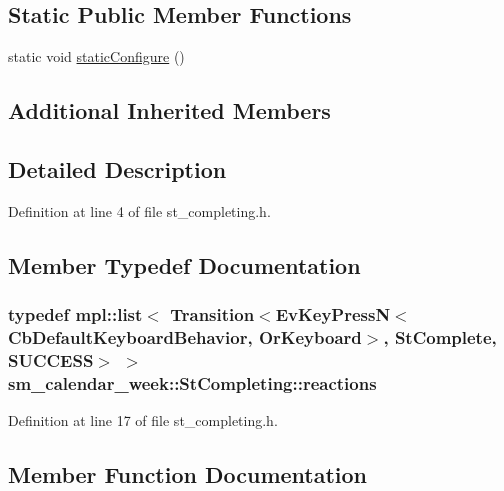 \subsection*{Static Public Member Functions}
\begin{DoxyCompactItemize}
\item 
static void \hyperlink{structsm__calendar__week_1_1StCompleting_a08bcc8c5171f5162b907def6a90c145e}{static\+Configure} ()
\end{DoxyCompactItemize}
\subsection*{Additional Inherited Members}


\subsection{Detailed Description}


Definition at line 4 of file st\+\_\+completing.\+h.



\subsection{Member Typedef Documentation}
\subsubsection[{\texorpdfstring{reactions}{reactions}}]{\setlength{\rightskip}{0pt plus 5cm}typedef mpl\+::list$<$ Transition$<$Ev\+Key\+PressN$<$Cb\+Default\+Keyboard\+Behavior, {\bf Or\+Keyboard}$>$, {\bf St\+Complete}, {\bf S\+U\+C\+C\+E\+SS}$>$ $>$ {\bf sm\+\_\+calendar\+\_\+week\+::\+St\+Completing\+::reactions}}\hypertarget{structsm__calendar__week_1_1StCompleting_ab93d532a6f82b095931053386a8aa89b}{}\label{structsm__calendar__week_1_1StCompleting_ab93d532a6f82b095931053386a8aa89b}


Definition at line 17 of file st\+\_\+completing.\+h.



\subsection{Member Function Documentation}

